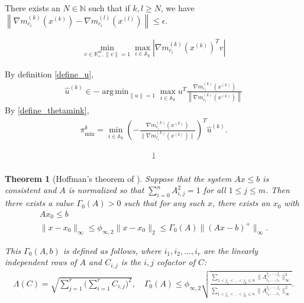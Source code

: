 \documentclass{article}
\newtheorem{theorem}{Theorem}[section]
\theoremstyle{case}
\numberwithin{theorem}{subsection}
\DeclareMathOperator*{\argmin}{arg\,min}
\newcommand{\activeconstraintsk}{{\mathbb A_{k}}}
\newcommand{\gmcik}{{\nabla m_{c_i}^{(k)}\left(\xk\right)}}
\newcommand{\hgik}{{\frac{\nabla m^{(k)}_{c_i}(\xk)}{\|\nabla m^{(k)}_{c_i}\left(\xk\right)\|}}}
\newcommand{\huff}{{\Gamma_0}}
\newcommand{\huk}{{{\hat u}^{(k)}}}
\newcommand{\mcik}{{{m}^{(k)}_{c_i}}}
\newcommand{\mcil}{{{m}^{(l)}_{c_i}}}
\newcommand{\naturals}{\mathbb N}
\newcommand{\Rm}{\mathbb R^m}
\newcommand{\thetamink}{{\pi^k_{\textrm{min}}}}
\newcommand{\xk}{x^{(k)}}
\newcommand{\xl}{{x^{(l)}}}
\begin{document}
There exists an $N \in \naturals$ such that if $k, l \ge N$, we have $\left\|\nabla \mcik\left(\xk\right) - \nabla \mcil\left(\xl\right) \right\| \le \epsilon$.

\begin{align*}
\min_{v \in \Rm_+, \|v\| = 1} \max_{i \in \activeconstraintsk} \left|\gmcik^T v\right|
\end{align*}


By definition \cref{define_u},
\begin{align*}
\huk \in -\argmin_{\|u\| = 1} \max_{i \in \activeconstraintsk} u^T \frac{\gmcik}{\left\|\gmcik\right\|}
\end{align*}
By \cref{define_thetamink},
\begin{align*}
\thetamink = \min_{i \in \activeconstraintsk} \left(-\hgik\right)^T \huk.
\end{align*}



\begin{align*}
\frac 1 {}
\end{align*}
\color{black}



\color{red}
\begin{theorem}[Hoffman's theorem of \cite{hoffman_theorem}]
\label{hoffman_old}
Suppose that the system $Ax \le b$ is consistent and $A$ is normalized so that $\sum_{i = 0}^n{A}_{i,j}^2 = 1$ for all $1 \le j \le m$.
Then there exists a value $\huff(A) > 0$ such that for any such $x$, there exists an $x_0$ with
\begin{align*}
Ax_0 \le b \\
\|x - x_0\|_{\infty} \le \phi_{\infty, 2}\|x - x_0\|_2 \le {\huff(A)} \|(Ax - b)^+\|_\infty.
\end{align*}

This $\huff(A,b)$ is defined as follows, where $i_1, i_2, \ldots, i_r$ are the linearly independent rows of $A$ and $C_{i,j}$ is the $i,j$ cofactor of $C$:
\begin{align*}
\Lambda(C) = \sqrt{\sum_{j=1}^r\bigg(\sum_{i=1}^r C_{i,j}\bigg)^2}, \quad
{\huff(A)} \le \phi_{\infty, 2}\sqrt{\frac{\sum_{1 < j_1 < \ldots < j_k \le n} \|\Lambda^{j_1,\ldots,j_r}_{i_1,\ldots, i_r}\|_{\infty}^2}{\sum_{1 < j_1 < \ldots < j_k \le n} \|A^{j_1,\ldots,j_r}_{i_1,\ldots, i_r}\|_{\infty}^2}}.
\end{align*}
\end{theorem}
\end{document}

